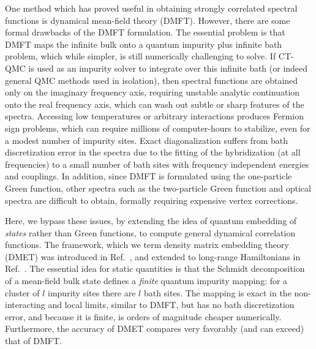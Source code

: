 \documentclass[aps,twocolumn,nobibnotes]{revtex4}
\begin{document}
One method which has proved useful in obtaining strongly correlated spectral functions is dynamical mean-field 
theory (DMFT)\cite{Georges1992,Georges1996,Kotliar2006}. 
However, there are some formal drawbacks of the DMFT formulation. 
The essential problem is that DMFT maps the infinite bulk onto a quantum impurity plus infinite bath problem, which while 
simpler, is still numerically challenging to solve.
If CT-QMC is used as an 
impurity solver to integrate over this infinite bath (or indeed general QMC methods used in isolation), then spectral 
functions are obtained only on the imaginary frequency 
axis, requiring unstable analytic continuation onto the real frequency axis, which can wash out subtle or sharp features of the 
spectra\cite{Millis2009}. Accessing low temperatures or arbitrary interactions produces Fermion sign problems, which can require millions
of computer-hours to stabilize, even for a modest number of impurity sites.
Exact diagonalization suffers from bath discretization error in the spectra due to the 
fitting of the hybridization (at all frequencies) to a small number of bath sites with 
frequency independent energies and couplings\cite{Liebsch2012}. In addition, since DMFT
is formulated using the one-particle Green function, other spectra such as the two-particle Green function and optical spectra are 
difficult to obtain, formally requiring expensive vertex corrections\cite{Millis2012}. 

Here, we bypass these issues, by extending the idea of quantum embedding of {\em states} rather than Green functions, to compute general dynamical
correlation functions. The framework, which we term density matrix embedding theory (DMET) was introduced in 
Ref.~, and extended to long-range Hamiltonians in Ref.~. 
The essential idea for static quantities is that the Schmidt decomposition of a mean-field bulk state defines a {\em finite} quantum impurity mapping:
for a cluster of $l$ impurity sites there are $l$ bath sites. The mapping is exact in the non-interacting and local limits, similar to DMFT, but
has no bath discretization error, and because it is finite, is orders of magnitude cheaper numerically. Furthermore, the accuracy of DMET compares
very favorably (and can exceed) that of DMFT.
\end{document}
